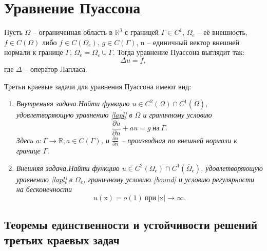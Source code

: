 \section{Уравнение Пуассона}
    Пусть \( \Omega \) -- ограниченная область в \( \mathbb{R}^3 \) с границей \( \Gamma \in C^1 \), \( \Omega_e \) -- её внешность, \( f \in C\left( \Omega \right) \) либо \( f \in C\left( \Omega_e \right) \), \( g \in C \left( \Gamma \right) \), \( \mathrm{n} \) -- единичный вектор внешней нормали к границе \(\Gamma\), \( \overline{\Omega}_e = \Omega_e \cup \Gamma \). Тогда уравнение Пуассона выглядит так:
    \begin{equation}
        \Delta u = f, \label{lapl}
    \end{equation}
    где \(\Delta\) -- оператор Лапласа.


    Третьи краевые задачи для уравнения Пуассона имеют вид:
    \begin{enumerate}
        \item \it Внутренняя задача.\normalfont Найти функцию \(u \in C^2 \left(\Omega\right) \cap C^1 ( \overline{\Omega} ) \), удовлетворяющую уравнению \eqref{lapl} в \( \Omega \) и граничному условию 
        \begin{equation}
            \frac{\partial u}{\partial n} + au = g ~ \text{на} ~ \Gamma. \label{bound}
        \end{equation}
        Здесь \( a: \Gamma \rightarrow \mathbb{R}, a \in C(\Gamma) \), и \( \frac{\partial u}{\partial n} \) -- производная по внешней нормали к границе \( \Gamma \).
        \item \it Внешняя задача.\normalfont Найти функцию \(u \in C^2 \left(\Omega_e\right) \cap C^1 ( \overline{\Omega}_e ) \), удовлетворяющую уравнению \eqref{lapl} в \( \Omega_e \), граничному условию \eqref{bound} и условию регулярности на бесконечности
        \begin{equation}
            u( \mathrm{x} ) = o(1) ~ \text{при} ~ |\mathrm{x}| \to \infty. \label{reg}
        \end{equation}
    \end{enumerate}

    \subsection{Теоремы единственности и устойчивости решений третьих краевых задач}


